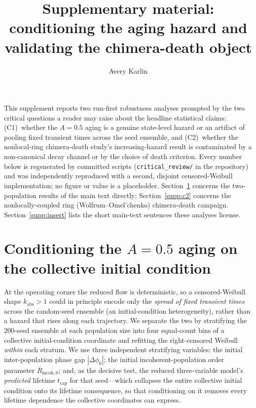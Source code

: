 \documentclass[11pt]{article}
\title{\bfseries Supplementary material:\\ conditioning the aging hazard and validating
the chimera-death object}
\author{Avery Karlin}
\date{}
\newcommand{\kabs}{k_{\mathrm{abs}}}
\begin{document}
\maketitle

\noindent
This supplement reports two run-first robustness analyses prompted by the two critical
questions a reader may raise about the headline statistical claims: (C1)~whether the
$A=0.5$ aging is a genuine state-level hazard or an artifact of pooling fixed transient
times across the seed ensemble, and (C2)~whether the nonlocal-ring chimera-death study's
increasing-hazard result is contaminated by a non-canonical decay channel or by the
choice of death criterion. Every number below is regenerated by committed scripts
(\texttt{critical\_review/} in the repository) and was independently reproduced with a
second, disjoint censored-Weibull implementation; no figure or value is a placeholder.
Section~\ref{supp:c1} concerns the two-population results of the main text directly;
Section~\ref{supp:c2} concerns the nonlocally-coupled ring (Wolfrum--Omel'chenko)
chimera-death campaign. Section~\ref{supp:insert} lists the short main-text sentences
these analyses license.

\section{Conditioning the $A=0.5$ aging on the collective initial condition}
\label{supp:c1}

At the operating corner the reduced flow is deterministic, so a censored-Weibull shape
$\kabs>1$ could in principle encode only the \emph{spread of fixed transient times} across
the random-seed ensemble (an initial-condition heterogeneity), rather than a hazard that
rises along each trajectory. We separate the two by stratifying the $200$-seed ensemble
at each population size into four equal-count bins of a collective initial-condition
coordinate and refitting the right-censored Weibull \emph{within} each stratum. We use
three independent stratifying variables: the initial inter-population phase gap
$|\Delta\phi_0|$; the initial incoherent-population order parameter
$\overline{R}_{\mathrm{incoh},0}$; and,
as the decisive test, the reduced three-variable model's \emph{predicted} lifetime
$t_{\mathrm{cap}}$ for that seed---which collapses the entire collective initial condition
onto its lifetime consequence, so that conditioning on it removes every lifetime
dependence the collective coordinates can express.
\end{document}
